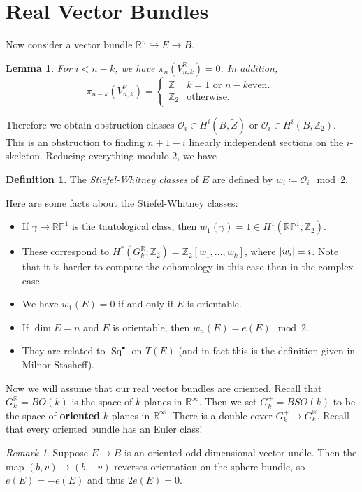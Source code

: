 \documentclass[leqno, openany]{memoir}
\newtheorem{lem}[thm]{Lemma}
\theoremstyle{definition}
\newtheorem{defn}[thm]{Definition}
\theoremstyle{remark}
\newtheorem{rmk}[thm]{Remark}
\theoremstyle{plain}
\theoremstyle{definition}
\theoremstyle{remark}
\newcommand{\R}{\mathbb{R}}
\newcommand{\Z}{\mathbb{Z}}
\renewcommand{\P}{\mathbb{P}}
\newcommand{\mc}[1]{\mathcal{#1}}
\newcommand{\wt}[1]{\widetilde{#1}}
\DeclareMathOperator{\Sq}{Sq}
\begin{document}
\section{Real Vector Bundles}%

Now consider a vector bundle $\R^n \hookrightarrow E \to B$.

\begin{lem} For $i < n-k$, we have $\pi_n(V_{n,k}^{\R}) = 0$. In addition, \[
    \pi_{n-k}(V_{n,k}^{\R}) = \begin{cases} \Z & k=1 \text{ or } n-k \text{
    even. } \\ \Z_2 & \text{otherwise}.  \end{cases} \] \end{lem} Therefore we
    obtain obstruction classes $\mc{O}_i \in H^i(B, \wt{Z})$ or $\mc{O}_i \in
    H^i(B, \Z_2)$. This is an obstruction to finding $n+1-i$ linearly
    independent sections on the $i$-skeleton. Reducing everything modulo $2$,
    we have \begin{defn} The \textit{Stiefel-Whitney classes} of $E$ are
        defined by $w_i \coloneqq \mc{O}_i \mod 2$.  \end{defn} Here are some
        facts about the Stiefel-Whitney classes: \begin{itemize} \item If
            $\gamma \to \R\P^1$ is the tautological class, then $w_1(\gamma) =
            1 \in H^1(\R\P^1, \Z_2)$.  \item These correspond to $H^*(G_k^{\R};
            \Z_2) = \Z_2[w_1, \ldots, w_k]$, where $\abs{w_i} = i$. Note that
            it is harder to compute the cohomology in this case than in the
            complex case.  \item We have $w_1(E) = 0$ if and only if $E$ is
            orientable.  \item If $\dim E = n$ and $E$ is orientable, then
    $w_n(E) = e(E) \mod 2$.  \item They are related to $\Sq^{\bullet}$ on
    $T(E)$ (and in fact this is the definition given in Milnor-Stasheff).
    \end{itemize}

Now we will assume that our real vector bundles are oriented. Recall that
$G_k^{\R} = BO(k)$ is the space of $k$-planes in $\R^{\infty}$. Then we set
$G_k^+ = BSO(k)$ to be the space of \textbf{oriented} $k$-planes in
$\R^{\infty}$. There is a double cover $G_k^+ \to G_k^{\R}$. Recall that every
oriented bundle has an Euler class!  \begin{rmk} Suppose $E \to B$ is an
oriented odd-dimensional vector undle. Then the map $(b, v) \mapsto (b,-v)$
reverses orientation on the sphere bundle, so $e(E) = -e(E)$ and thus $2e(E) =
0$.  \end{rmk}
\end{document}
